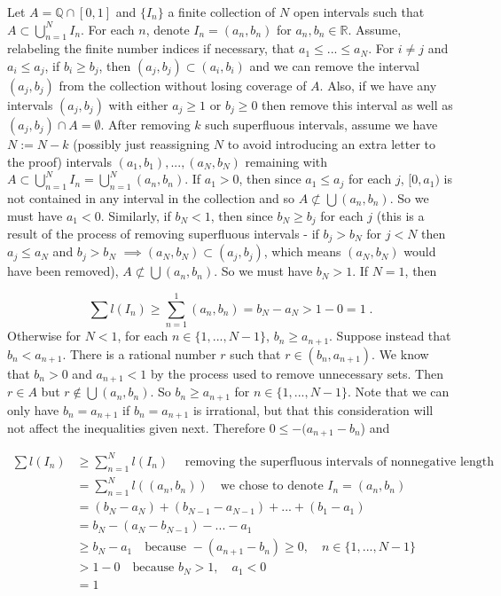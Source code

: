 \documentclass[a4paper]{article}
\begin{document}
Let $A = \mathbb{Q}\cap [0,1]$ and $\{I_n\}$ a finite collection of $N$ open intervals such that $A\subset \bigcup_{n=1}^N I_n$. For each $n$, denote $I_n = (a_n,b_n)$ for $a_n,b_n \in \mathbb{R}$. Assume, relabeling the finite number indices if necessary, that $a_1 \leq ... \leq a_N$. For $i\neq j$ and $a_i \leq a_j$, if $b_i \geq b_j$, then $(a_j,b_j) \subset (a_i,b_i)$ and we can remove the interval $(a_j,b_j)$ from the collection without losing coverage of $A$. Also, if we have any intervals $(a_j,b_j)$ with either $a_j \geq 1$ or $b_j \geq 0$ then remove this interval as well as $(a_j,b_j) \cap A = \emptyset$. After removing $k$ such superfluous intervals, assume we have $N := N-k$ (possibly just reassigning $N$ to avoid introducing an extra letter to the proof) intervals $(a_1,b_1),...,(a_N,b_N)$ remaining with $A \subset \bigcup_{n = 1}^N I_n = \bigcup_{n =1}^N (a_n,b_n)$. If $a_1> 0 $, then since $a_1\leq a_j$ for each $j$, $[0,a_1)$ is not contained in any interval in the collection and so $A \not\subset \bigcup (a_n,b_n)$. So we must have $a_1 < 0$. Similarly, if $b_N < 1$, then since $b_N \geq b_j$ for each $j$ (this is a result of the process of removing superfluous intervals - if $b_j > b_N$ for $j < N$ then $a_j \leq a_N$ and $b_j > b_N$ $\implies (a_N,b_N) \subset (a_j, b_j)$, which means $(a_N,b_N)$ would have been removed), $A \not\subset \bigcup (a_n,b_n)$. So we must have $b_N > 1$.  If $N=1$, then

$$\sum l(I_n) \geq \sum_{n=1}^1 (a_n,b_n) = b_N - a_N > 1-0 = 1 \;.$$
Otherwise for $N < 1$, for each $n \in \{1,...,N-1\}$, $b_n \geq a_{n+1}$. Suppose instead that $b_n < a_{n+1}$. There is a rational number $r$ such that $r \in (b_n,a_{n+1})$. We know that $b_n > 0$ and $a_{n+1} < 1$ by the process used to remove unnecessary sets. Then $r \in A$ but $r \not \in \bigcup (a_n,b_n)$. So $b_n \geq a_{n+1}$ for $n \in \{1,...,N-1\}$. Note that we can only have $b_n = a_{n+1}$ if $b_n = a_{n+1}$ is irrational, but that this consideration will not affect the inequalities given next. Therefore $0\leq  -(a_{n+1} - b_n$) and

\begin{align*}
\sum l(I_n) & \geq \sum_{n=1}^N l(I_n) \quad \text{ removing the superfluous intervals of nonnegative length}\\
&= \sum_{n=1}^N l((a_n,b_n)) \quad \text{we chose to denote } I_n = (a_n,b_n)\\
&= (b_N - a_N) + (b_{N-1} -a_{N-1}) + ... + (b_1 - a_1)\\
&= b_N - (a_{N}-b_{N-1}) - ... - a_1 \\
&\geq b_N - a_1 \quad \text{because } -(a_{n+1} - b_n) \geq 0,\quad  n \in \{1,...,N-1\}\\
&> 1 - 0 \quad \text{because } b_N > 1, \quad a_1 < 0\\
&= 1
\end{align*}
\end{document}
